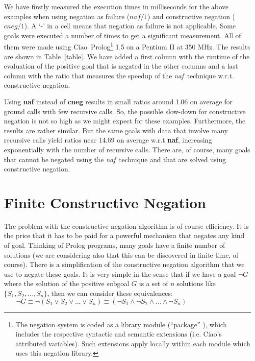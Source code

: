 \documentclass{llncs}
\newcommand{\naf}{{\em naf}}\newcommand{\viejo}[1]{}
\newcommand{\ciao}{Ciao}
\begin{document}
We have firstly measured the execution times in milliseconds for the
above examples when using negation as failure ($naf/1$) and
constructive negation ($cneg/1$). A `-' in a cell means that negation
as failure is not applicable. Some goals were executed a number of
times to get a significant measurement. All of them were made using
\ciao\ Prolog\footnote{The negation system is coded as a library
module (``package'' \cite{ciao-modules-cl2000}), which includes the
respective syntactic and semantic extensions (i.e. Ciao's attributed
variables). Such extensions apply locally within each module which
uses this negation library.} 1.5 on a Pentium II at 350 MHz. The
results are shown in Table~\ref{table}. We have added a first column
with the runtime of the evaluation of the positive goal that is
negated in the other columns and a last column with the ratio that
measures the speedup of the \naf\ technique w.r.t. constructive
negation.

Using {\bf naf} instead of {\bf cneg} results in small ratios around
1.06 on average for ground calls with few recursive calls. So, the
possible slow-down for constructive negation is not so high as we
might expect for these examples. Furthermore, the results are rather
similar. But the same goals with data that involve many recursive
calls yield ratios near 14.69 on average w.r.t {\bf naf},
increasing exponentially with the number of recursive calls. There
are, of course, many goals that cannot be negated using the \naf\
technique and that are solved using constructive negation.

 


\section{Finite Constructive Negation}
\label{cnegf}

The problem with the constructive negation algorithm is of course
efficiency. It is the price that it has to be paid for a powerful
mechanism that negates any kind of goal. Thinking of Prolog programs,
many goals have a finite number of solutions (we are considering also
that this can be discovered in finite time, of course). There is a
simplification of the constructive negation algorithm that we use to
negate these goals. It is very simple in the sense that if we have a
goal $\neg G$ where the solution of the positive subgoal $G$ is a set
of $n$ solutions like $\{S_1, S_2,...,S_n\}$, then we can consider
these equivalences: %
$~~~~~~~~\neg G \equiv \neg(S_1 \vee S_2 \vee ... \vee S_n) 
 \equiv (\neg S_1 \wedge \neg S_2 \wedge ... \wedge \neg S_n)$
\end{document}

